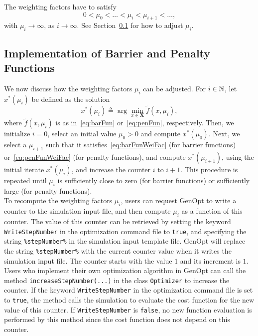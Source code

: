 The weighting factors have to satisfy
\begin{equation}
   0 < \mu_0 < \ldots < \mu_i < \mu_{i+1} < \ldots,
  \label{eq:penFunWeiFac}
\end{equation}
with $\mu_i \to \infty$, as $i \to \infty$.
See Section~\ref{sec:ImpWeiFac} for how to adjust $\mu_i$.

\subsection{Implementation of Barrier and Penalty Functions}
\label{sec:ImpWeiFac}

We now discuss how the weighting factors $\mu_i$ can be adjusted.
For $i \in {\mathbb N}$, let $x^*(\mu_i)$ be defined as the solution
\begin{equation}
 x^*(\mu_i) \triangleq \arg \min_{x \in \mathbf X} \widetilde f(x, \mu_i),
\end{equation}
where $\widetilde f(x, \mu_i)$ is as in~\eqref{eq:barFun} or~\eqref{eq:penFun}, respectively.
Then, we initialize $i=0$, select an initial value $\mu_0 > 0$ and compute $x^*(\mu_0)$.
Next, we select a $\mu_{i+1}$ such that it satisfies~\eqref{eq:barFunWeiFac}
(for barrier functions) or~\eqref{eq:penFunWeiFac} (for penalty functions),
and compute $x^*(\mu_{i+1})$, using the initial iterate $x^*(\mu_i)$, and increase the counter 
$i$ to $i+1$.
This procedure is repeated until $\mu_i$ is sufficiently close to zero (for barrier functions)
or sufficiently large (for penalty functions).\\

To recompute the weighting factors $\mu_i$, 
users can request GenOpt to write a counter to the simulation input file, and then compute
$\mu_i$ as a function of this counter.
The value of this counter can be retrieved by 
setting the keyword \texttt{WriteStepNumber} in the optimization command file to \texttt{true},
and specifying the string \texttt{\%stepNumber\%} in the simulation input template file. 
GenOpt will replace the string \texttt{\%stepNumber\%} with the current counter value 
when it writes the simulation input file.
The counter starts with the value $1$ and its increment is $1$.\\

Users who implement their own optimization algorithm in GenOpt can call the method
\texttt{increaseStepNumber(...)} in the class \texttt{Optimizer} to increase the counter.
If the keyword \texttt{WriteStepNumber} in the optimization command file is set to \texttt{true}, the method calls the simulation to evaluate the cost function for the new value of this counter. If \texttt{WriteStepNumber} is \texttt{false}, no new function evaluation is performed by this method since the cost function does not depend on this counter.\\




